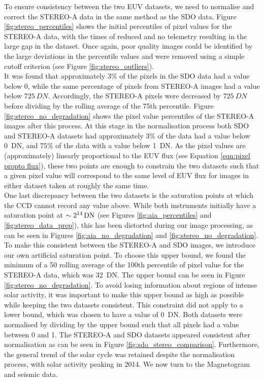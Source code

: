 \documentclass[11pt,a4paper,onecolumn]{report}
\begin{document}
To ensure consistency between the two EUV datasets, we need to normalise and
correct the STEREO-A data in the same method as the SDO data. Figure
\ref{fig:stereo_percentiles} shows the initial percentiles of pixel values for
the STEREO-A data, with the times of reduced and no telemetry resulting in the
large gap in the dataset. Once again, poor quality images could be identified by the
large deviations in the percentile values and were removed using a simple
cutoff criterion (see Figure \ref{fig:stereo_outliers}).\\

It was found that approximately $3 \%$ of the pixels in the SDO data had a value
below 0, while the same percentage of pixels from STEREO-A images had a value
below $\SI[]{725}[]{DN}$. Accordingly, the STEREO-A pixels were decreased by
$\SI[]{725}[]{DN}$ before dividing by the rolling average of the 75th
percentile. Figure \ref{fig:stereo_no_degradation} shows the pixel value
percentiles of the STEREO-A images after this process. At this stage in the
normalisation process both SDO and STEREO-A datasets had approximately $3 \%$ of
the data had a value below \SI{0}{DN}, and $75 \%$ of the data with a value
below \SI{1}{DN}. As the pixel values are (approximately) linearly proportional
to the EUV flux (see Equation \ref{eqn:pixel propto flux}), these two points are
enough to constrain the two datasets such that a given pixel value will
correspond to the same level of EUV flux for images in either dataset taken
at roughly the same time. \\

One last discrepancy between the two datasets is the saturation points at which
the CCD cannot record any value above. While both instruments initially have a
saturation point at $ \sim \SI[parse-numbers=false]{2^{14}}[]{DN}$ (see Figures
\ref{fig:aia_percentiles} and \ref{fig:stereo_data_prep}), this has been
distorted during our image processing, as can be seen in Figures
\ref{fig:aia_no_degradation} and \ref{fig:stereo_no_degradation}. To make this
consistent between the STEREO-A and SDO images, we introduce our own artificial
saturation point. To choose this upper bound, we found the minimum of a 50
rolling average of the 100th percentile of pixel value for the STEREO-A data,
which was \SI[]{32}[]{DN}. The upper bound can be seen in Figure
\ref{fig:stereo_no_degradation}. To avoid losing information about regions of
intense solar activity, it was important to make this upper bound as high as
possible while keeping the two datasets consistent. This constraint did not
apply to a lower bound, which was chosen to have a value of \SI{0}{DN}. Both
datasets were normalised by dividing by the upper bound such that all pixels had
a value between 0 and 1. The STEREO-A and SDO datasets appeared consistent after
normalisation as can be seen in Figure \ref{fig:sdo_stereo_comparison}. Furthermore,
the general trend of the solar cycle was retained despite the normalisation
process, with solar activity peaking in 2014. We now turn to the Magnetogram and
seismic data.
\end{document}
